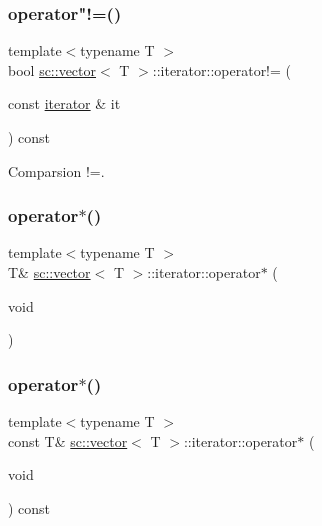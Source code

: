 \subsubsection{\texorpdfstring{operator"!=()}{operator!=()}}
{\footnotesize\ttfamily template$<$typename T $>$ \\
bool \hyperlink{classsc_1_1vector}{sc\+::vector}$<$ T $>$\+::iterator\+::operator!= (\begin{DoxyParamCaption}\item[{const \hyperlink{classsc_1_1vector_1_1iterator}{iterator} \&}]{it }\end{DoxyParamCaption}) const\hspace{0.3cm}{\ttfamily [inline]}}



Comparsion !=. 

\mbox{\label{classsc_1_1vector_1_1iterator_a195ce221fcaf875739014d681073eaeb}} 
\subsubsection{\texorpdfstring{operator$\ast$()}{operator*()}\hspace{0.1cm}{\footnotesize\ttfamily [1/2]}}
{\footnotesize\ttfamily template$<$typename T $>$ \\
T\& \hyperlink{classsc_1_1vector}{sc\+::vector}$<$ T $>$\+::iterator\+::operator$\ast$ (\begin{DoxyParamCaption}\item[{void}]{ }\end{DoxyParamCaption})\hspace{0.3cm}{\ttfamily [inline]}}

\mbox{\label{classsc_1_1vector_1_1iterator_acc1afb3186e955cd261c757dae2b587a}} 
\subsubsection{\texorpdfstring{operator$\ast$()}{operator*()}\hspace{0.1cm}{\footnotesize\ttfamily [2/2]}}
{\footnotesize\ttfamily template$<$typename T $>$ \\
const T\& \hyperlink{classsc_1_1vector}{sc\+::vector}$<$ T $>$\+::iterator\+::operator$\ast$ (\begin{DoxyParamCaption}\item[{void}]{ }\end{DoxyParamCaption}) const\hspace{0.3cm}{\ttfamily [inline]}}

